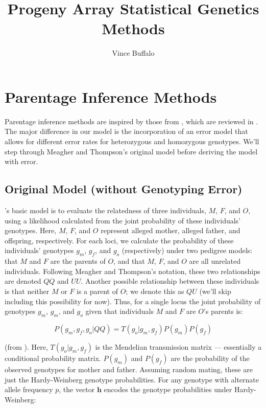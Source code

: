 \documentclass[11pt]{article}
\title{
Progeny Array Statistical Genetics Methods
}
\author{
Vince Buffalo
}
\begin{document}
\maketitle

\section{Parentage Inference Methods}

Parentage inference methods are inspired by those from \citet{meagher1986},
which are reviewed in \citet{marshall1998}. The major difference in our model
is the incorporation of an error model that allows for different error rates
for heterozygous and homozygous genotypes. We'll step through Meagher and
Thompson's original model before deriving the model with error.

\subsection{Original Model (without Genotyping Error)}

\citeauthor{meagher1986}'s basic model is to evaluate the relatedness of three
individuals, $M$, $F$, and $O$, using a likelihood calculated from the joint
probability of these individuals' genotypes. Here, $M$, $F$, and $O$ represent
alleged mother, alleged father, and offspring, respectively. For each loci, we
calculate the probability of these individuals' genotypes $g_m$, $g_f$, and
$g_o$ (respectively) under two pedigree models: that $M$ and $F$ are the
parents of $O$, and that $M$, $F$, and $O$ are all unrelated individuals.
Following Meagher and Thompson's notation, these two relationships are denoted
$QQ$ and $UU$. Another possible relationship between these individuals is that
neither $M$ or $F$ is a parent of $O$; we denote this as $QU$ (we'll skip
including this possibility for now). Thus, for a single locus the joint
probability of genotypes $g_m$, $g_m$, and $g_o$ given that individuals $M$ and
$F$ are $O$'s parents is:

$$ P(g_m, g_f, g_o | QQ) = T(g_o | g_m, g_f) P(g_m) P(g_f) $$

(from \citealt{meagher1986}). Here, $T(g_o | g_m, g_f)$ is the
Mendelian transmission matrix --- essentially a conditional probability matrix.
$P(g_m)$ and $P(g_f)$ are the probability of the observed genotypes for mother
and father. Assuming random mating, these are just the Hardy-Weinberg genotype
probabilities. For any genotype with alternate allele frequency $p$, the vector
$\bm{h}$ encodes the genotype probabilities under Hardy-Weinberg:
\end{document}
